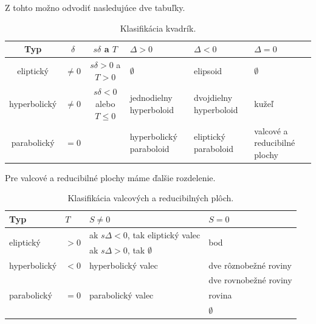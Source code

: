 Z tohto možno odvodiť nasledujúce dve tabuľky.

\begin{table}[H]
\centering
\begin{tabular}{|c|c|c|p{2.2cm}|p{2.15cm}|p{2cm}|}
\hline
Typ & $\delta$ & $s\delta$ a $T$ & $\Delta > 0$ & $\Delta < 0$ & $\Delta = 0$ \\
\hline
eliptický & $\neq 0$ & $s\delta>0$ a $T>0$ & $\emptyset$ & elipsoid & $\emptyset$ \\
\hline
hyperbolický & $\neq 0$ & $s\delta<0$ alebo $T \leq0$ & jednodielny hyperboloid & dvojdielny hyperboloid & kužeľ \\
\hline
parabolický & $=0$ & & hyperbolický paraboloid & eliptický paraboloid & valcové a reducibilné plochy \\
\hline
\end{tabular}
\caption{Klasifikácia kvadrík.}
\label{tab:classification_of_quadrics}
\end{table}


Pre valcové a reducibilné plochy máme ďalšie rozdelenie.

\begin{table}[H]
\centering
\begin{tabular}{|l|l|l|l|}
\hline
Typ & $T$ & $S \neq  0$ & $S = 0 $ \\
\hline
\multirow{2}{*}{eliptický} & \multirow{2}{*}{$> 0$} & ak $s\Delta < 0$, tak eliptický valec & \multirow{2}{*}{bod} \\
& & ak $s\Delta > 0$, tak $\emptyset$ &\\
\hline
hyperbolický & $< 0$ & hyperbolický valec & dve rôznobežné roviny \\
\hline
\multirow{3}{*}{parabolický} & \multirow{3}{*}{$= 0$} & \multirow{3}{*}{parabolický valec} & dve rovnobežné roviny \\
& & & rovina \\
& & & $\emptyset$ \\
\hline
\end{tabular}
\caption{Klasifikácia valcových a reducibilných plôch.}
\label{tab:degenerate_quadrics}
\end{table}

